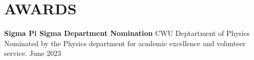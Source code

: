 \documentclass[a4paper,9pt]{extarticle}
\begin{document}
\vspace{-0.2in}
\section*{AWARDS}
\textbf{Sigma Pi Sigma Department Nomination} \hfill CWU Deptartment of Physics\\
Nominated by the Physics department for academic excellence and volunteer service. \hfill June 2023


\end{document}
